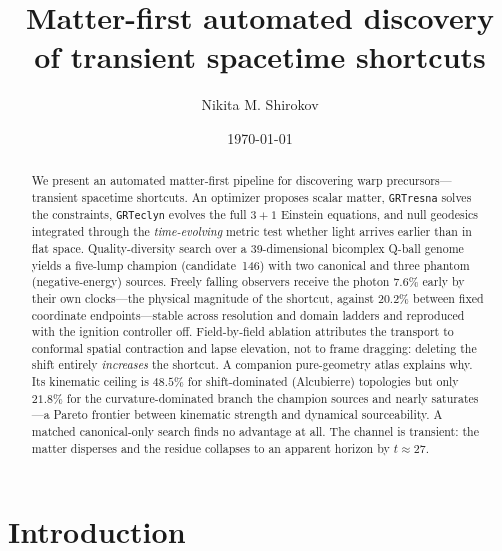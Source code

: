 \documentclass[twocolumn,floatfix,aps,prd,nofootinbib]{revtex4-2}
\begin{document}
\title{Matter-first automated discovery of transient spacetime shortcuts}

\author{Nikita M. Shirokov}
\date{\today}

\begin{abstract}
We present an automated matter-first pipeline for discovering warp
precursors---transient spacetime shortcuts. An optimizer proposes scalar
matter, \texttt{GRTresna} solves the constraints, \texttt{GRTeclyn} evolves the
full $3{+}1$ Einstein equations, and null geodesics integrated through the
\emph{time-evolving} metric test whether light arrives earlier than in flat
space. Quality-diversity search over a 39-dimensional bicomplex Q-ball genome
yields a five-lump champion (candidate~146) with two canonical and three
phantom (negative-energy) sources. Freely falling observers receive the photon
$7.6\%$ early by their own clocks---the physical magnitude of the shortcut,
against $20.2\%$ between fixed coordinate endpoints---stable across resolution
and domain ladders and reproduced with the ignition controller off.
Field-by-field ablation attributes the transport to conformal spatial
contraction and lapse elevation, not to frame dragging: deleting the shift
entirely \emph{increases} the shortcut. A companion pure-geometry atlas
explains why. Its kinematic ceiling is $48.5\%$ for shift-dominated
(Alcubierre) topologies but only $21.8\%$ for the curvature-dominated branch
the champion sources and nearly saturates---a Pareto frontier between kinematic
strength and dynamical sourceability. A matched canonical-only search finds no
advantage at all. The channel is transient: the matter disperses and the
residue collapses to an apparent horizon by $t\approx27$.
\end{abstract}

\maketitle

\section{Introduction}
\label{sec:intro}
\end{document}
